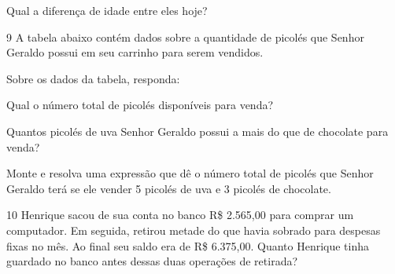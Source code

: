 {\begin{escolha}
\item
  Qual a diferença de idade entre eles hoje?

\end{escolha}


\num{9} A tabela abaixo contém dados sobre a quantidade de picolés que
Senhor Geraldo possui em seu carrinho para serem vendidos.



Sobre os dados da tabela, responda:

\begin{escolha}
\item
  Qual o número total de picolés disponíveis para venda?


\item
Quantos picolés de uva Senhor Geraldo possui a mais do que de chocolate
para venda?


\item
Monte e resolva uma expressão que dê o número total de picolés que Senhor
Geraldo terá se ele vender 5 picolés de uva e 3 picolés de chocolate.

\end{escolha}


\num{10} Henrique sacou de sua conta no banco R\$ 2.565,00 para comprar
um computador. Em seguida, retirou metade do que havia sobrado para
despesas fixas no mês. Ao final seu saldo era de R\$ 6.375,00. Quanto
Henrique tinha guardado no banco antes dessas duas operações de retirada?

}
